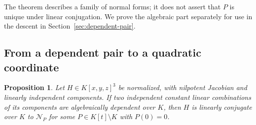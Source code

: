 \documentclass[11pt,reqno]{amsart}
\newtheorem{proposition}[theorem]{Proposition}
\theoremstyle{definition}
\theoremstyle{remark}
\numberwithin{equation}{section}
\newcommand{\Ncal}{\mathcal N}
\begin{document}
The theorem describes a family of normal forms; it does not assert that $P$ is unique under linear conjugation. We prove the algebraic part separately for use in the descent in Section~\ref{sec:dependent-pair}.

\subsection{From a dependent pair to a quadratic coordinate}
\begin{proposition}\label{prop:pair-normal}
Let $H\in K[x,y,z]^3$ be normalized, with nilpotent Jacobian and linearly independent components. If two independent constant linear combinations of its components are algebraically dependent over $K$, then $H$ is linearly conjugate over $K$ to $\Ncal_P$ for some $P\in K[t]\setminus K$ with $P(0)=0$.
\end{proposition}
\end{document}
